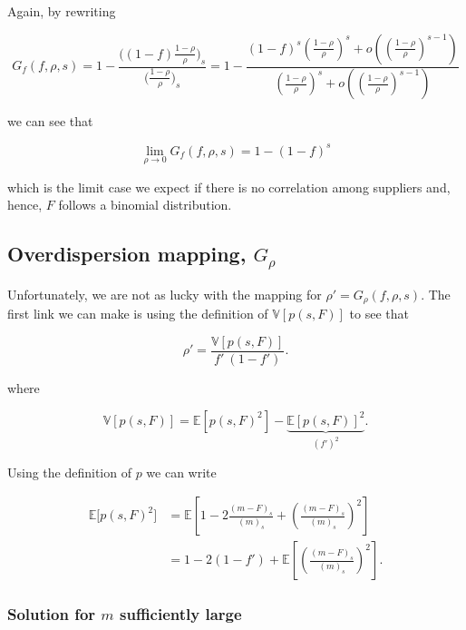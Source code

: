 \documentclass[american, abstract=on]{scrartcl}
\theoremstyle{plain}
\newcommand{\E}{\mathbb{E}}
\newcommand{\V}{\mathbb{V}}
\begin{document}
Again, by rewriting

\begin{equation} \label{eq:limit_Gf}
    G_f(f, \rho, s) = 1 - \frac{\Big( (1-f) \frac{1 - \rho}{\rho} \Big)_s}{\Big( \frac{1 - \rho}{\rho} \Big)_s} = 1 - \frac{(1 - f)^s \left(\frac{1 - \rho}{\rho}\right)^s + o\left(\left(\frac{1 - \rho}{\rho}\right)^{s - 1} \right) }{\left(\frac{1 - \rho}{\rho}\right)^s + o\left(\left(\frac{1 - \rho}{\rho}\right)^{s - 1} \right)}
\end{equation}

we can see that

\begin{equation}
    \lim_{\rho \rightarrow 0} G_f(f, \rho, s) = 1 - (1 - f)^s
\end{equation}

which is the limit case we expect if there is no correlation among suppliers and, hence, $F$ follows a binomial distribution.

\subsection[Overdispersion mapping]{Overdispersion mapping, $G_\rho$}

Unfortunately, we are not as lucky with the mapping for $\rho' = G_{\rho}(f, \rho, s)$. The first link we can make is using the definition of $\V[p(s, F)]$ to see that

\begin{equation}
    \rho' = \frac{\V[p(s, F)]}{f' \ (1 - f')}.
\end{equation}

where

\begin{equation}
    \V[p(s, F)] = \E[p(s, F)^2] - \underbrace{\E[p(s, F)]^2}_{\left(f'\right)^2}.
\end{equation}

Using the definition of $p$ we can write

\begin{equation}
    \begin{split}
        \E\big[ p(s, F)^2 \big] &= \E\left[1 - 2 \frac{(m - F)_s}{(m)_s} + \left(\frac{(m - F)_s}{(m)_s}  \right)^2\right] \\
        &= 1 - 2(1 - f') + \E\left[ \left(\frac{(m - F)_s}{(m)_s}  \right)^2 \right].
    \end{split}
\end{equation}

\subsubsection[Solution for m sufficiently large]{Solution for $m$ sufficiently large}
\end{document}
